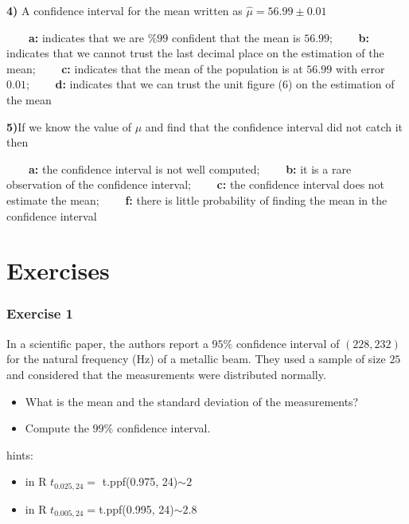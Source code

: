 \documentclass[
]{book}
\begin{document}
\textbf{4)} A confidence interval for the mean written as \(\hat{\mu}=56.99 \pm 0.01\)

\textbf{\(\qquad\)a:} indicates that we are \(\%99\) confident that the mean is \(56.99\);
\textbf{\(\qquad\)b:} indicates that we cannot trust the last decimal place on the estimation of the mean;
\textbf{\(\qquad\)c:} indicates that the mean of the population is at \(56.99\) with error \(0.01\);
\textbf{\(\qquad\)d:} indicates that we can trust the unit figure (\(6\)) on the estimation of the mean

\textbf{5)}If we know the value of \(\mu\) and find that the confidence interval did not catch it then

\textbf{\(\qquad\)a:} the confidence interval is not well computed;
\textbf{\(\qquad\)b:} it is a rare observation of the confidence interval;
\textbf{\(\qquad\)c:} the confidence interval does not estimate the mean;
\textbf{\(\qquad\)f:} there is little probability of finding the mean in the confidence interval

\hypertarget{exercises-11}{%
\section{Exercises}\label{exercises-11}}

\hypertarget{exercise-1-10}{%
\subsubsection{Exercise 1}\label{exercise-1-10}}

In a scientific paper, the authors report a \(95\%\) confidence interval of \((228, 232)\) for the natural frequency (Hz) of a metallic beam. They used a sample of size \(25\) and considered that the measurements were distributed normally.

\begin{itemize}
\item
  What is the mean and the standard deviation of the measurements?
\item
  Compute the \(99\%\) confidence interval.
\end{itemize}

hints:

\begin{itemize}
\item
  in R \(t_{0.025, 24}=\) t.ppf(0.975, 24)\(\sim 2\)
\item
  in R \(t_{0.005, 24}=\)t.ppf(0.995, 24)\(\sim 2.8\)
\end{itemize}
\end{document}

